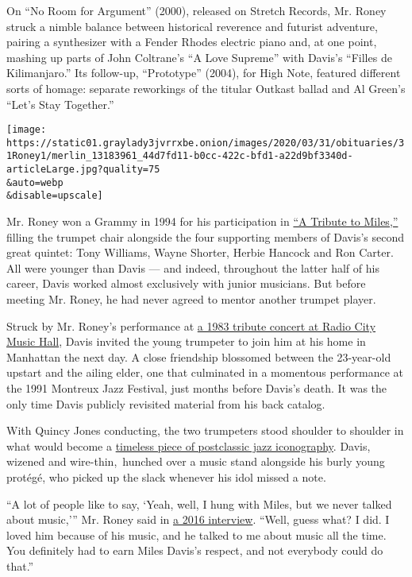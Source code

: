 On ``No Room for Argument'' (2000), released on Stretch Records, Mr.
Roney struck a nimble balance between historical reverence and futurist
adventure, pairing a synthesizer with a Fender Rhodes electric piano
and, at one point, mashing up parts of John Coltrane's ``A Love
Supreme'' with Davis's ``Filles de Kilimanjaro.'' Its follow-up,
``Prototype'' (2004), for High Note, featured different sorts of homage:
separate reworkings of the titular Outkast ballad and Al Green's ``Let's
Stay Together.''

\texttt{[image: https://static01.graylady3jvrrxbe.onion/images/2020/03/31/obituaries/31Roney1/merlin\_13183961\_44d7fd11-b0cc-422c-bfd1-a22d9bf3340d-articleLarge.jpg?quality=75\\\&auto=webp\\\&disable=upscale]}

Mr. Roney won a Grammy in 1994 for his participation in
\href{https://www.youtube.com/watch?v=r_DJJyJ5Ogg\&feature=emb_title}{``A
Tribute to Miles,''} filling the trumpet chair alongside the four
supporting members of Davis's second great quintet: Tony Williams, Wayne
Shorter, Herbie Hancock and Ron Carter. All were younger than Davis ---
and indeed, throughout the latter half of his career, Davis worked
almost exclusively with junior musicians. But before meeting Mr. Roney,
he had never agreed to mentor another trumpet player.

Struck by Mr. Roney's performance at
\href{https://www.nytimes3xbfgragh.onion/1983/11/09/arts/concert-davis-tribute.html}{a
1983 tribute concert at Radio City Music Hall}, Davis invited the young
trumpeter to join him at his home in Manhattan the next day. A close
friendship blossomed between the 23-year-old upstart and the ailing
elder, one that culminated in a momentous performance at the 1991
Montreux Jazz Festival, just months before Davis's death. It was the
only time Davis publicly revisited material from his back catalog.

With Quincy Jones conducting, the two trumpeters stood shoulder to
shoulder in what would become a
\href{https://www.facebookcorewwwi.onion/JazzImprovisers/photos/a.969266783184007/1194385580672125/?type=1\&theater}{timeless
piece of postclassic jazz iconography}. Davis, wizened and
wire-thin,~hunched over a music stand alongside his burly young protégé,
who picked up the slack whenever his idol missed a note.

``A lot of people like to say, `Yeah, well, I hung with Miles, but we
never talked about music,''' Mr. Roney said in
\href{https://www.youtube.com/watch?v=8cxUYcUbdBg}{a 2016 interview}.
``Well, guess what? I did. I loved him because of his music, and he
talked to me about music all the time. You definitely had to earn Miles
Davis's respect, and not everybody could do that.''


